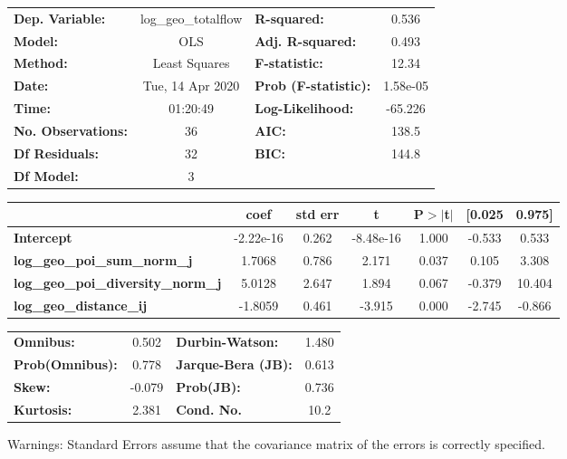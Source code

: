 \begin{center}
\begin{tabular}{lclc}
\toprule
\textbf{Dep. Variable:}                    & log\_geo\_totalflow & \textbf{  R-squared:         } &     0.536   \\
\textbf{Model:}                            &         OLS         & \textbf{  Adj. R-squared:    } &     0.493   \\
\textbf{Method:}                           &    Least Squares    & \textbf{  F-statistic:       } &     12.34   \\
\textbf{Date:}                             &   Tue, 14 Apr 2020  & \textbf{  Prob (F-statistic):} &  1.58e-05   \\
\textbf{Time:}                             &       01:20:49      & \textbf{  Log-Likelihood:    } &   -65.226   \\
\textbf{No. Observations:}                 &            36       & \textbf{  AIC:               } &     138.5   \\
\textbf{Df Residuals:}                     &            32       & \textbf{  BIC:               } &     144.8   \\
\textbf{Df Model:}                         &             3       & \textbf{                     } &             \\
\bottomrule
\end{tabular}
\begin{tabular}{lcccccc}
                                           & \textbf{coef} & \textbf{std err} & \textbf{t} & \textbf{P$> |$t$|$} & \textbf{[0.025} & \textbf{0.975]}  \\
\midrule
\textbf{Intercept}                         &    -2.22e-16  &        0.262     & -8.48e-16  &         1.000        &       -0.533    &        0.533     \\
\textbf{log\_geo\_poi\_sum\_norm\_j}       &       1.7068  &        0.786     &     2.171  &         0.037        &        0.105    &        3.308     \\
\textbf{log\_geo\_poi\_diversity\_norm\_j} &       5.0128  &        2.647     &     1.894  &         0.067        &       -0.379    &       10.404     \\
\textbf{log\_geo\_distance\_ij}            &      -1.8059  &        0.461     &    -3.915  &         0.000        &       -2.745    &       -0.866     \\
\bottomrule
\end{tabular}
\begin{tabular}{lclc}
\textbf{Omnibus:}       &  0.502 & \textbf{  Durbin-Watson:     } &    1.480  \\
\textbf{Prob(Omnibus):} &  0.778 & \textbf{  Jarque-Bera (JB):  } &    0.613  \\
\textbf{Skew:}          & -0.079 & \textbf{  Prob(JB):          } &    0.736  \\
\textbf{Kurtosis:}      &  2.381 & \textbf{  Cond. No.          } &     10.2  \\
\bottomrule
\end{tabular}
\end{center}

Warnings: \newline
 [1] Standard Errors assume that the covariance matrix of the errors is correctly specified.